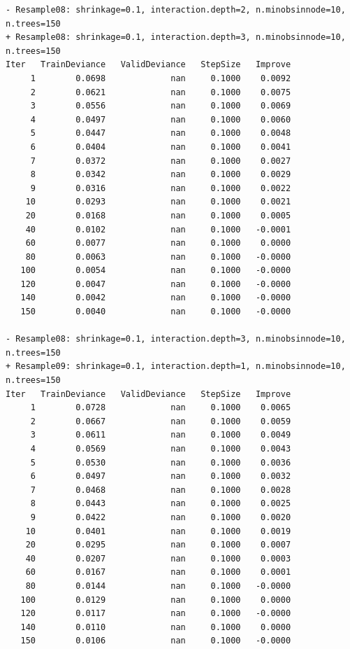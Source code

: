 \documentclass[
  letterpaper,
  DIV=11,
  numbers=noendperiod]{scrartcl}
\begin{document}
\begin{verbatim}
- Resample08: shrinkage=0.1, interaction.depth=2, n.minobsinnode=10, n.trees=150 
+ Resample08: shrinkage=0.1, interaction.depth=3, n.minobsinnode=10, n.trees=150 
Iter   TrainDeviance   ValidDeviance   StepSize   Improve
     1        0.0698             nan     0.1000    0.0092
     2        0.0621             nan     0.1000    0.0075
     3        0.0556             nan     0.1000    0.0069
     4        0.0497             nan     0.1000    0.0060
     5        0.0447             nan     0.1000    0.0048
     6        0.0404             nan     0.1000    0.0041
     7        0.0372             nan     0.1000    0.0027
     8        0.0342             nan     0.1000    0.0029
     9        0.0316             nan     0.1000    0.0022
    10        0.0293             nan     0.1000    0.0021
    20        0.0168             nan     0.1000    0.0005
    40        0.0102             nan     0.1000   -0.0001
    60        0.0077             nan     0.1000    0.0000
    80        0.0063             nan     0.1000   -0.0000
   100        0.0054             nan     0.1000   -0.0000
   120        0.0047             nan     0.1000   -0.0000
   140        0.0042             nan     0.1000   -0.0000
   150        0.0040             nan     0.1000   -0.0000

- Resample08: shrinkage=0.1, interaction.depth=3, n.minobsinnode=10, n.trees=150 
+ Resample09: shrinkage=0.1, interaction.depth=1, n.minobsinnode=10, n.trees=150 
Iter   TrainDeviance   ValidDeviance   StepSize   Improve
     1        0.0728             nan     0.1000    0.0065
     2        0.0667             nan     0.1000    0.0059
     3        0.0611             nan     0.1000    0.0049
     4        0.0569             nan     0.1000    0.0043
     5        0.0530             nan     0.1000    0.0036
     6        0.0497             nan     0.1000    0.0032
     7        0.0468             nan     0.1000    0.0028
     8        0.0443             nan     0.1000    0.0025
     9        0.0422             nan     0.1000    0.0020
    10        0.0401             nan     0.1000    0.0019
    20        0.0295             nan     0.1000    0.0007
    40        0.0207             nan     0.1000    0.0003
    60        0.0167             nan     0.1000    0.0001
    80        0.0144             nan     0.1000   -0.0000
   100        0.0129             nan     0.1000    0.0000
   120        0.0117             nan     0.1000   -0.0000
   140        0.0110             nan     0.1000    0.0000
   150        0.0106             nan     0.1000   -0.0000


\end{verbatim}
\end{document}
